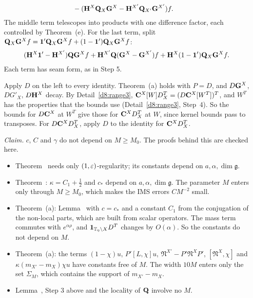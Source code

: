 \begin{detail}
\begin{step}[$\bC$]
\[\begin{aligned}
&-(\mathbf H^X\mathbf Q_X\mathbf G^X-\mathbf H^{X'}\mathbf Q_{X'}\mathbf G^{X'})f .
\end{aligned}
\]
The middle term telescopes into products with one difference factor, each controlled by Theorem~(e). For the last term, split $\mathbf Q_X\mathbf G^Xf=\mathbf 1'\mathbf Q_X\mathbf G^Xf+(1-\mathbf 1')\mathbf Q_X\mathbf G^Xf$:
\[
(\mathbf H^X\mathbf 1'-\mathbf H^{X'})\mathbf Q\mathbf G^Xf+\mathbf H^{X'}\mathbf Q(\mathbf G^X-\mathbf G^{X'})f+\mathbf H^X(1-\mathbf 1')\mathbf Q_X\mathbf G^Xf .
\]
Each term has seam form, as in Step 5.
\end{step}
\begin{step}
Apply $D$ on the left to every identity. Theorem~(a) holds with $P=D$, and $D\mathbf G^X$, $DG'_X$, $D\mathbf H^X$ decay. By Detail~\ref{d8:range3}, $\mathbf C^X[W]D^T_X=(D\mathbf C^X[W^T])^T$, and $W^T$ has the properties that the bounds use (Detail~\ref{d8:range3}, Step~4). So the bounds for $D\mathbf C^X$ at $W^T$ give those for $\mathbf C^XD^T_X$ at $W$, since kernel bounds pass to transposes. For $D\mathbf C^XD^T_X$, apply $D$ to the identity for $\mathbf C^XD^T_X$.
\end{step}
\end{detail}

\begin{detail}\label{d8:ix2}
\emph{Claim.} $c$, $C$ and $\gamma$ do not depend on $M\ge M_0$. The proofs behind this are checked here.
\begin{itemize}
\item Theorem~ needs only $(1,\varepsilon)$-regularity; its constants depend on $a,\alpha,\dim\mathfrak g$.
\item Theorem~: $\kappa=C_1+\frac12$ and $c_*$ depend on $a,\alpha,\dim\mathfrak g$. The parameter $M$ enters only through $M\ge M_0$, which makes the IMS errors $CM^{-2}$ small.
\item Theorem~(a): Lemma~ with $c=c_*$ and a constant $C_1$ from the conjugation of the non-local parts, which are built from scalar operators. The mass term commutes with $e^{\alpha\rho}$, and $\mathbf 1_{\mathbb T_\eta\setminus X}D^T$ changes by $O(\alpha)$. So the constants do not depend on $M$.
\item Theorem~(a): the terms $(1-\chi)u$, $P'[L,\chi]u$, $\mathfrak N^{X'}-P'\mathfrak N^XP'$, $[\mathfrak N^X,\chi]$ and $\kappa(m_{X'}-m_X)\chi u$ have constants free of $M$. The width $10M$ enters only the set $\Sigma_M$, which contains the support of $m_{X'}-m_X$.
\item Lemma~, Step 3 above and the locality of $\mathbf Q$ involve no $M$.
\end{itemize}
\end{detail}

